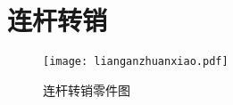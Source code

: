 \chapter{连杆转销}
\begin{figure}[htbp]
\centering
\texttt{[image: lianganzhuanxiao.pdf]}
\caption{连杆转销零件图}\label{fig:lianganzhuanxiao}
\end{figure}
\endinput